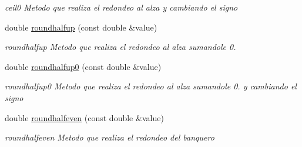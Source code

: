 \begin{DoxyCompactItemize}
\begin{DoxyCompactList}\small\item\em ceil0 Metodo que realiza el redondeo al alza y cambiando el signo \end{DoxyCompactList}\item 
double \hyperlink{class_math_operation_a6a719d663bfc475ea89a723a918a8121}{roundhalfup} (const double \&value)
\begin{DoxyCompactList}\small\item\em roundhalfup Metodo que realiza el redondeo al alza sumandole 0. \end{DoxyCompactList}\item 
double \hyperlink{class_math_operation_aa778c04f56422ba5d0caebc208a7c399}{roundhalfup0} (const double \&value)
\begin{DoxyCompactList}\small\item\em roundhalfup0 Metodo que realiza el redondeo al alza sumandole 0. y cambiando el signo \end{DoxyCompactList}\item 
double \hyperlink{class_math_operation_a744616f90b70846920b138ef40f0f110}{roundhalfeven} (const double \&value)
\begin{DoxyCompactList}\small\item\em roundhalfeven Metodo que realiza el redondeo del banquero \end{DoxyCompactList}\end{DoxyCompactItemize}
